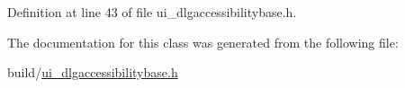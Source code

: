 Definition at line 43 of file ui\+\_\+dlgaccessibilitybase.\+h.



The documentation for this class was generated from the following file\+:\begin{DoxyCompactItemize}
\item 
build/\hyperlink{ui__dlgaccessibilitybase_8h}{ui\+\_\+dlgaccessibilitybase.\+h}\end{DoxyCompactItemize}
